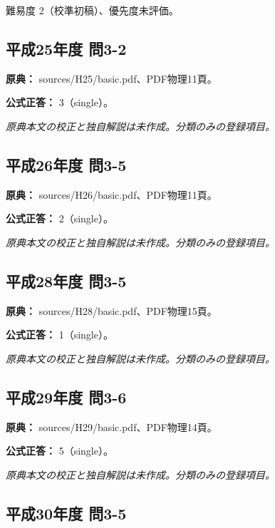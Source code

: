 \par 難易度 2（校準初稿）、優先度未評価。

\subsection{平成25年度 問3-2}
\label{q:h25-reg-basic-3-2}

\noindent\textbf{原典：} sources/H25/basic.pdf、PDF物理11頁。

\textbf{公式正答：} 3（single）。

\par\textit{原典本文の校正と独自解説は未作成。分類のみの登録項目。}

\subsection{平成26年度 問3-5}
\label{q:h26-reg-basic-3-5}

\noindent\textbf{原典：} sources/H26/basic.pdf、PDF物理11頁。

\textbf{公式正答：} 2（single）。

\par\textit{原典本文の校正と独自解説は未作成。分類のみの登録項目。}

\subsection{平成28年度 問3-5}
\label{q:h28-reg-basic-3-5}

\noindent\textbf{原典：} sources/H28/basic.pdf、PDF物理15頁。

\textbf{公式正答：} 1（single）。

\par\textit{原典本文の校正と独自解説は未作成。分類のみの登録項目。}

\subsection{平成29年度 問3-6}
\label{q:h29-reg-basic-3-6}

\noindent\textbf{原典：} sources/H29/basic.pdf、PDF物理14頁。

\textbf{公式正答：} 5（single）。

\par\textit{原典本文の校正と独自解説は未作成。分類のみの登録項目。}

\subsection{平成30年度 問3-5}
\label{q:h30-reg-basic-3-5}

